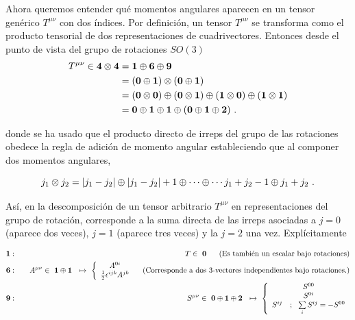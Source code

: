 Ahora queremos entender qué momentos angulares aparecen en un tensor genérico $T^{\mu \nu}$ con dos índices. Por definición, un tensor $T^{\mu \nu}$ se transforma como el producto tensorial de dos representaciones de cuadrivectores. Entonces desde el punto de vista del grupo de rotaciones $SO(3)$
 \begin{equation}
 \begin{split}
     T^{\mu \nu} \in \vb*{4} \otimes \vb*{4} &= \vb*{1} \oplus \vb*{6} \oplus \vb*{9} \\
     &= (\vb*{0} \oplus \vb*{1}) \otimes (\vb*{0} \oplus \vb*{1})\\
     &= (\vb*{0} \otimes \vb*{0}) \oplus (\vb*{0} \otimes \vb*{1}) \oplus (\vb*{1} \otimes \vb*{0}) \oplus (\vb*{1} \otimes \vb*{1})\\
     &= \vb*{0} \oplus \vb*{1} \oplus \vb*{1} \oplus ( \vb*{0} \oplus \vb*{1} \oplus \vb*{2} ) ~.
 \end{split} 
 \end{equation}

donde se ha usado que el producto directo de irreps del grupo de las rotaciones obedece la regla de adición de momento angular estableciendo que al componer dos momentos angulares,

\begin{equation}
    j_{1} \otimes j_{2} = \abs{j_{1}-j_{2}} \oplus \abs{j_{1}-j_{2}}+1 \oplus  \cdots  \oplus \cdots j_{1}+j_{2}-1  \oplus j_{1}+j_{2}~.
\end{equation}

Así, en la descomposición de un tensor arbitrario $T^{\mu \nu}$ en representaciones del grupo de rotación, corresponde a la suma directa de las irreps asociadas a $j = 0$ (aparece dos veces), $j = 1$ (aparece tres veces) y la $j = 2$ una vez. Explícitamente

\begin{eqnarray*}
\mathbf{1} &:&~~\ T\in ~\mathbf{0~~\ \ }~\text{(Es tambi\'{e}n un escalar bajo rotaciones)}  \notag \\
\mathbf{6} &:&~~\ A^{\mu \nu }\in ~\mathbf{1\oplus 1}~\ \mapsto ~\left\{ 
\begin{array}{c}
A^{0i} \\ 
\frac{1}{2}\epsilon ^{ijk}A^{jk}%
\end{array}%
\right. \text{ \ \ (Corresponde a dos 3-vectores independientes bajo
rotaciones.)} \\
\mathbf{9} &:&~~\ S^{\mu \nu }\in ~\mathbf{0\oplus 1\oplus 2}~\ \mapsto
~\left\{ 
\begin{array}{c}
S^{00} \\ 
S^{0i} \\ 
S^{ij}~\ \ ;~\ \sum\limits_{i}S^{ij}=-S^{00}
\end{array}
\right.   \notag
\end{eqnarray*}

